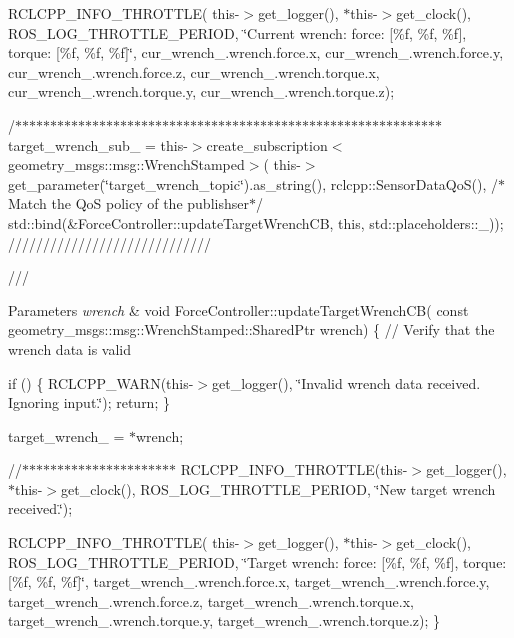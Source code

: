 RCLCPP\+\_\+\+INFO\+\_\+\+THROTTLE( this-\/$>$get\+\_\+logger(), $\ast$this-\/$>$get\+\_\+clock(), ROS\+\_\+\+LOG\+\_\+\+THROTTLE\+\_\+\+PERIOD, \char`\"{}\+Current wrench\+:  force\+: \mbox{[}\%f, \%f, \%f\mbox{]}, torque\+: \mbox{[}\%f, \%f, \%f\mbox{]}\char`\"{}, cur\+\_\+wrench\+\_\+.\+wrench.\+force.\+x, cur\+\_\+wrench\+\_\+.\+wrench.\+force.\+y, cur\+\_\+wrench\+\_\+.\+wrench.\+force.\+z, cur\+\_\+wrench\+\_\+.\+wrench.\+torque.\+x, cur\+\_\+wrench\+\_\+.\+wrench.\+torque.\+y, cur\+\_\+wrench\+\_\+.\+wrench.\+torque.\+z);

/$\ast$$\ast$$\ast$$\ast$$\ast$$\ast$$\ast$$\ast$$\ast$$\ast$$\ast$$\ast$$\ast$$\ast$$\ast$$\ast$$\ast$$\ast$$\ast$$\ast$$\ast$$\ast$$\ast$$\ast$$\ast$$\ast$$\ast$$\ast$$\ast$$\ast$$\ast$$\ast$$\ast$$\ast$$\ast$$\ast$$\ast$$\ast$$\ast$$\ast$$\ast$$\ast$$\ast$$\ast$$\ast$$\ast$$\ast$$\ast$$\ast$$\ast$$\ast$$\ast$$\ast$$\ast$$\ast$$\ast$$\ast$$\ast$$\ast$$\ast$$\ast$ target\+\_\+wrench\+\_\+sub\+\_\+ = this-\/$>$create\+\_\+subscription$<$geometry\+\_\+msgs\+::msg\+::\+Wrench\+Stamped$>$( this-\/$>$get\+\_\+parameter(\char`\"{}target\+\_\+wrench\+\_\+topic\char`\"{}).as\+\_\+string(), rclcpp\+::\+Sensor\+Data\+Qo\+S(), /$\ast$\+Match the QoS policy of the publishser$\ast$/ std\+::bind(\&Force\+Controller\+::update\+Target\+Wrench\+CB, this, std\+::placeholders\+::\+\_)); /////////////////////////////

///
\begin{DoxyParams}{Parameters}
{\em wrench} & void Force\+Controller\+::update\+Target\+Wrench\+CB( const geometry\+\_\+msgs\+::msg\+::\+Wrench\+Stamped\+::\+Shared\+Ptr wrench) \{ // Verify that the wrench data is valid\\
\hline
\end{DoxyParams}
if () \{ RCLCPP\+\_\+\+WARN(this-\/$>$get\+\_\+logger(), \char`\"{}\+Invalid wrench data received. Ignoring input.\char`\"{}); return; \}

target\+\_\+wrench\+\_\+ = $\ast$wrench;

//$\ast$$\ast$$\ast$$\ast$$\ast$$\ast$$\ast$$\ast$$\ast$$\ast$$\ast$$\ast$$\ast$$\ast$$\ast$$\ast$$\ast$$\ast$$\ast$$\ast$$\ast$$\ast$ RCLCPP\+\_\+\+INFO\+\_\+\+THROTTLE(this-\/$>$get\+\_\+logger(), $\ast$this-\/$>$get\+\_\+clock(), ROS\+\_\+\+LOG\+\_\+\+THROTTLE\+\_\+\+PERIOD, \char`\"{}\+New target wrench received.\char`\"{});

RCLCPP\+\_\+\+INFO\+\_\+\+THROTTLE( this-\/$>$get\+\_\+logger(), $\ast$this-\/$>$get\+\_\+clock(), ROS\+\_\+\+LOG\+\_\+\+THROTTLE\+\_\+\+PERIOD, \char`\"{}\+Target wrench\+:  force\+: \mbox{[}\%f, \%f, \%f\mbox{]}, torque\+: \mbox{[}\%f, \%f, \%f\mbox{]}\char`\"{}, target\+\_\+wrench\+\_\+.\+wrench.\+force.\+x, target\+\_\+wrench\+\_\+.\+wrench.\+force.\+y, target\+\_\+wrench\+\_\+.\+wrench.\+force.\+z, target\+\_\+wrench\+\_\+.\+wrench.\+torque.\+x, target\+\_\+wrench\+\_\+.\+wrench.\+torque.\+y, target\+\_\+wrench\+\_\+.\+wrench.\+torque.\+z); \} 